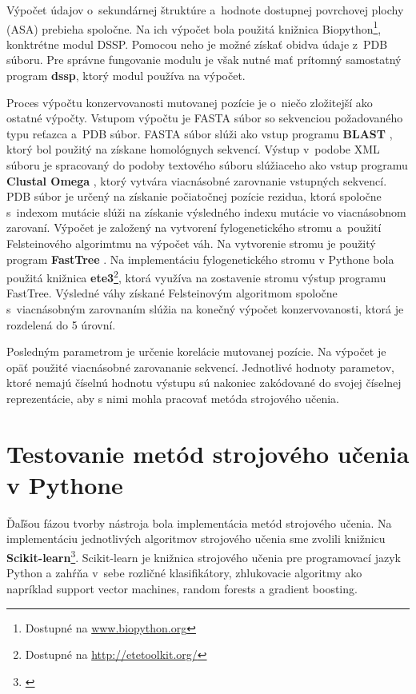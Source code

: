 Výpočet údajov o~sekundárnej štruktúre a~hodnote dostupnej povrchovej plochy (ASA) prebieha spoločne. Na ich výpočet bola použitá knižnica Biopython\footnote{Dostupné na \url{www.biopython.org}}, konktrétne modul DSSP. Pomocou neho je možné získať obidva údaje z~PDB súboru. Pre správne fungovanie modulu je však nutné mať prítomný samostatný program \textbf{dssp}, ktorý modul používa na výpočet.

Proces výpočtu konzervovanosti mutovanej pozície je o~niečo zložitejší ako ostatné výpočty. Vstupom výpočtu je FASTA súbor so sekvenciou požadovaného typu reťazca a~PDB súbor. FASTA súbor slúži ako vstup programu \textbf{BLAST} \cite{blastp}, ktorý bol použitý na získane homológnych sekvencí. Výstup v~podobe XML súboru je spracovaný do podoby textového súboru slúžiaceho ako vstup programu \textbf{Clustal Omega} \cite{clustal}, ktorý vytvára viacnásobné zarovnanie vstupných sekvencí.
PDB súbor je určený na získanie počiatočnej pozície rezidua, ktorá spoločne s~indexom mutácie slúži na získanie výsledného indexu mutácie vo viacnásobnom zarovaní. Výpočet je založený na vytvorení fylogenetického stromu a~použití Felsteinového algorimtmu na výpočet váh. Na vytvorenie stromu je použitý program \textbf{FastTree} \cite{fasttree}. Na implementáciu fylogenetického stromu v Pythone bola použitá knižnica \textbf{ete3}\footnote{Dostupné na \url{http://etetoolkit.org/}}, ktorá využíva na zostavenie stromu výstup programu FastTree. Výsledné váhy získané Felsteinovým algoritmom spoločne s~viacnásobným zarovnaním slúžia na konečný výpočet konzervovanosti, ktorá je rozdelená do 5 úrovní.

Posledným parametrom je určenie korelácie mutovanej pozície. Na výpočet je opäť použité viacnásobné zarovananie sekvencí. Jednotlivé hodnoty parametov, ktoré nemajú číselnú hodnotu výstupu sú nakoniec zakódované do svojej číselnej reprezentácie, aby s nimi mohla pracovať metóda strojového učenia.

\section{Testovanie metód strojového učenia v Pythone}

Ďaľšou fázou tvorby nástroja bola implementácia metód strojového učenia. Na implementáciu jednotlivých algoritmov strojového učenia sme zvolili knižnicu \textbf{Scikit-learn}\footnote{\url{}}. Scikit-learn je knižnica strojového učenia pre programovací jazyk Python a zahŕňa v sebe rozličné klasifikátory, zhlukovacie algoritmy ako napríklad support vector machines, random forests a gradient boosting.

